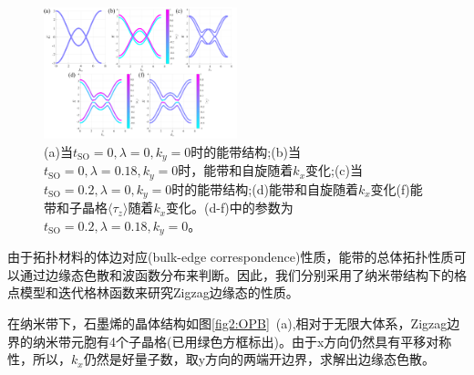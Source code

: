 	\begin{figure}
	    \centering
	    \includegraphics[width=0.5\textwidth]{pic/fig1.pdf}
	    \caption{(a)当$t_{\text{SO}}=0,\lambda=0,k_y=0$时的能带结构;(b)当$t_{\text{SO}}=0,\lambda=0.18,k_y=0$时，能带和自旋随着$k_x$变化;(c)当$t_{\text{SO}}=0.2,\lambda=0,k_y=0$时的能带结构;(d)能带和自旋随着$k_x$变化(f)能带和子晶格$\langle \tau_z\rangle$随着$ k_x$变化。(d-f)中的参数为$t_{\text{SO}}=0.2,\lambda=0.18,k_y=0$。}	    \label{fig1:BandStructure}
	\end{figure}
	
	
	由于拓扑材料的体边对应(bulk-edge correspondence)性质\cite{Hasan2010}，能带的总体拓扑性质可以通过边缘态色散和波函数分布来判断。因此，我们分别采用了纳米带结构下的格点模型\cite{Qi2006}和迭代格林函数\cite{sancho1985}来研究Zigzag边缘态的性质。
	
	在纳米带下，石墨烯的晶体结构如图\ref{fig2:OPB}~(a),相对于无限大体系，Zigzag边界的纳米带元胞有4个子晶格(已用绿色方框标出)。由于x方向仍然具有平移对称性，所以，$k_x$仍然是好量子数，取y方向的两端开边界，求解出边缘态色散。

